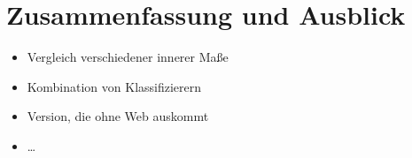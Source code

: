 \chapter{Zusammenfassung und Ausblick}

\TODO

\begin{itemize}
  \item Vergleich verschiedener innerer Maße
  \item Kombination von Klassifizierern
  \item Version, die ohne Web auskommt
  \item \dots
\end{itemize}